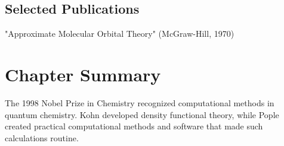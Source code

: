 \subsection*{Selected Publications}

"Approximate Molecular Orbital Theory" (McGraw-Hill, 1970)

\clearpage

\section*{Chapter Summary}

The 1998 Nobel Prize in Chemistry recognized computational methods in quantum chemistry. Kohn developed density functional theory, while Pople created practical computational methods and software that made such calculations routine.

